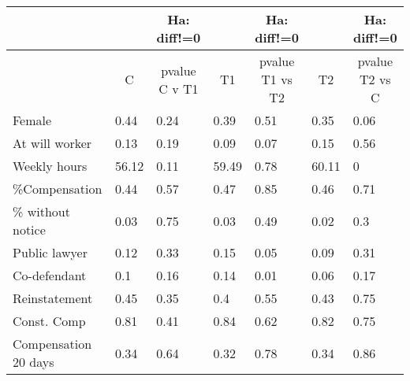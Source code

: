 \begin{tabular}{lrrrrrr}
\toprule
      & \multicolumn{1}{c}{} & \multicolumn{1}{c}{Ha: diff!=0} & \multicolumn{1}{c}{} & \multicolumn{1}{c}{Ha: diff!=0} & \multicolumn{1}{c}{} & \multicolumn{1}{c}{Ha: diff!=0} \\
\midrule
      & \multicolumn{1}{c}{C} & \multicolumn{1}{c}{pvalue C v T1} & \multicolumn{1}{c}{T1} & \multicolumn{1}{c}{pvalue T1 vs T2} & \multicolumn{1}{c}{T2} & \multicolumn{1}{c}{pvalue T2 vs C} \\
      \midrule
      \midrule
Female  & \multicolumn{1}{l}{0.44} & \multicolumn{1}{l}{0.24} & \multicolumn{1}{l}{0.39} & \multicolumn{1}{l}{0.51} & \multicolumn{1}{l}{0.35} & \multicolumn{1}{l}{0.06} \\
At will worker & \multicolumn{1}{l}{0.13} & \multicolumn{1}{l}{0.19} & \multicolumn{1}{l}{0.09} & \multicolumn{1}{l}{0.07} & \multicolumn{1}{l}{0.15} & \multicolumn{1}{l}{0.56} \\
Weekly hours  & \multicolumn{1}{l}{56.12} & \multicolumn{1}{l}{0.11} & \multicolumn{1}{l}{59.49} & \multicolumn{1}{l}{0.78} & \multicolumn{1}{l}{60.11} & \multicolumn{1}{l}{0} \\
\%Compensation & \multicolumn{1}{l}{0.44} & \multicolumn{1}{l}{0.57} & \multicolumn{1}{l}{0.47} & \multicolumn{1}{l}{0.85} & \multicolumn{1}{l}{0.46} & \multicolumn{1}{l}{0.71} \\
\% without notice & \multicolumn{1}{l}{0.03} & \multicolumn{1}{l}{0.75} & \multicolumn{1}{l}{0.03} & \multicolumn{1}{l}{0.49} & \multicolumn{1}{l}{0.02} & \multicolumn{1}{l}{0.3} \\
Public lawyer & \multicolumn{1}{l}{0.12} & \multicolumn{1}{l}{0.33} & \multicolumn{1}{l}{0.15} & \multicolumn{1}{l}{0.05} & \multicolumn{1}{l}{0.09} & \multicolumn{1}{l}{0.31} \\
Co-defendant & \multicolumn{1}{l}{0.1} & \multicolumn{1}{l}{0.16} & \multicolumn{1}{l}{0.14} & \multicolumn{1}{l}{0.01} & \multicolumn{1}{l}{0.06} & \multicolumn{1}{l}{0.17} \\
Reinstatement & \multicolumn{1}{l}{0.45} & \multicolumn{1}{l}{0.35} & \multicolumn{1}{l}{0.4} & \multicolumn{1}{l}{0.55} & \multicolumn{1}{l}{0.43} & \multicolumn{1}{l}{0.75} \\
Const. Comp & \multicolumn{1}{l}{0.81} & \multicolumn{1}{l}{0.41} & \multicolumn{1}{l}{0.84} & \multicolumn{1}{l}{0.62} & \multicolumn{1}{l}{0.82} & \multicolumn{1}{l}{0.75} \\
Compensation 20 days & \multicolumn{1}{l}{0.34} & \multicolumn{1}{l}{0.64} & \multicolumn{1}{l}{0.32} & \multicolumn{1}{l}{0.78} & \multicolumn{1}{l}{0.34} & \multicolumn{1}{l}{0.86} \\

\end{tabular}
